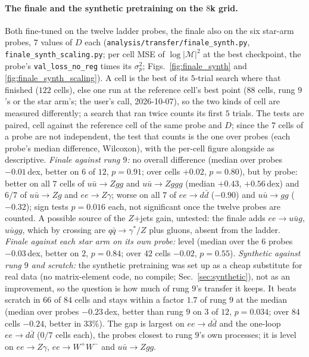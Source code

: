 \documentclass[11pt]{article}
\newcommand{\code}[1]{\texttt{#1}}
\begin{document}
\paragraph{The finale and the synthetic pretraining on the $8$k grid.} Both fine-tuned on the twelve ladder probes,
the finale also on the six star-arm probes, $7$ values of $D$ each (\code{analysis/transfer/finale\_synth.py},
\code{finale\_synth\_scaling.py}; per cell MSE of $\log|\mathcal M|^2$ at the best checkpoint, the probe's
\code{val\_loss\_no\_reg} times its $\sigma_p^2$; Figs.~\ref{fig:finale_synth} and \ref{fig:finale_synth_scaling}).
A cell is the best of its $5$-trial search where that finished ($122$ cells), else one run at the reference cell's best
point ($88$ cells, rung $9$'s or the star arm's; the user's call, 2026-10-07), so the two kinds of cell are measured
differently; a search that ran twice counts its first $5$ trials. The tests are paired, cell against the reference cell
of the same probe and $D$; since the $7$ cells of a probe are not independent, the test that counts is the one over
probes (each probe's median difference, Wilcoxon), with the per-cell figure alongside as descriptive.
\emph{Finale against rung $9$:} no overall difference (median over probes $-0.01$\,dex, better on $6$ of $12$,
$p=0.91$; over cells $+0.02$, $p=0.80$), but by probe: better on all $7$ cells of $u\bar u\to Zgg$ and $u\bar u\to Zggg$
(median $+0.43$, $+0.56$\,dex) and $6/7$ of $u\bar u\to Zg$ and $ee\to Z\gamma$; worse on all $7$ of $ee\to d\bar d$
($-0.90$) and $u\bar u\to gg$ ($-0.32$); sign tests $p=0.016$ each, not significant once the twelve probes are
counted. A possible source of the $Z$+jets gain, untested: the finale adds $ee\to u\bar ug$, $u\bar ugg$, which by
crossing are $q\bar q\to\gamma^*/Z$ plus gluons, absent from the ladder. \emph{Finale against each star arm on its own
probe:} level (median over the $6$ probes $-0.03$\,dex, better on $2$, $p=0.84$; over $42$ cells $-0.02$, $p=0.55$).
\emph{Synthetic against rung $9$ and scratch:} the synthetic pretraining was set up as a cheap substitute for real
data (no matrix-element code, no compile; Sec.~\ref{sec:synthetic}), not as an improvement, so the question is how much
of rung $9$'s transfer it keeps. It beats scratch in $66$ of $84$ cells and stays within a factor $1.7$ of rung $9$ at
the median (median over probes $-0.23$\,dex, better than rung $9$ on $3$ of $12$, $p=0.034$; over $84$ cells $-0.24$,
better in $33\%$). The gap is largest on $ee\to d\bar d$ and the one-loop $ee\to d\bar d$ ($0/7$ cells each), the probes
closest to rung $9$'s own processes; it is level on $ee\to Z\gamma$, $ee\to W^+W^-$ and $u\bar u\to Zgg$.
\end{document}
